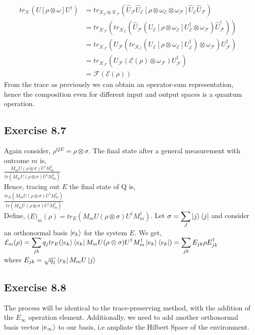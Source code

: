\documentclass[a4paper,12pt]{article}
\begin{document}
\begin{align*}
tr_\mathcal{K}(U[\rho\otimes\omega]U^\dagger)&=
tr_{\mathcal{K}_\mathcal{E}\otimes\mathcal{K}_\mathcal{F}}
(\hat{U}_\mathcal{F}\hat{U}_\mathcal{E}[\rho\otimes\omega_\mathcal{E}\otimes\omega_\mathcal{F}]
\hat{U}_\mathcal{E}\hat{U}_\mathcal{F})\\ 
&=tr_{\mathcal{K}_\mathcal{F}}(tr_{\mathcal{K}_\mathcal{E}}(\hat{U}_\mathcal{F}
(U_\mathcal{E}[\rho\otimes\omega_\mathcal{E}]U_\mathcal{E}^\dagger\otimes\omega_\mathcal{F})\hat{U}_\mathcal{F}^\dagger))\\
&= tr_{\mathcal{K}_\mathcal{F}}(U_\mathcal{F}(tr_{\mathcal{K}_\mathcal{E}}
(U_\mathcal{E}[\rho\otimes\omega_\mathcal{E}]U_\mathcal{E}^\dagger)\otimes\omega_\mathcal{F})U_\mathcal{F}^\dagger)\\
&= tr_{\mathcal{K}_\mathcal{F}}(U_\mathcal{F}(\mathcal{E}(\rho)
\otimes\omega_\mathcal{F})U_\mathcal{F}^\dagger)\\
&=\mathcal{F}(\mathcal{E}(\rho))
\end{align*}
From the trace as previously we can obtain an operator-sum representation, hence
the composition even for different input and output spaces is a quantum operation.
\subsection*{Exercise 8.7}
Again consider, $\rho^{QE}=\rho\otimes\sigma$. The final state after a general measurement
with outcome $m$ is,\\
$\frac{M_mU(\rho\otimes\sigma)U^\dagger M_m^\dagger}{tr(M_mU(\rho\otimes\sigma)U^\dagger M_m^\dagger)}$\\
Hence, tracing out $E$ the final state of Q is,\\
$\frac{tr_E(M_mU(\rho\otimes\sigma)U^\dagger M_m^\dagger)}{tr(M_mU(\rho\otimes\sigma)U^\dagger M_m^\dagger)}$\\
Define, $\mathcal(E)_m(\rho)=tr_E(M_mU(\rho\otimes\sigma)U^\dagger M_m^\dagger)$. Let 
$\sigma=\displaystyle \sum_J\ket{j}\bra{j}$ and consider an orthonormal basis $\ket{e_k}$
for the system $E$. We get,\\
$\mathcal{E}_m(\rho)=\displaystyle \sum_{jk}q_jtr_E(\ket{e_k}\bra{e_k}M_mU(\rho\otimes\sigma)U^\dagger M_m^\dagger\ket{e_k}\bra{e_k})=
\displaystyle \sum_{jk} E_{jk}\rho E_{jk}^\dagger$\\
where $E_{jk}=\sqrt{q_j}\bra{e_k}M_mU\ket{j}$
\subsection*{Exercise 8.8}
The process will be identical to the trace-preserving method, with the addition of the 
$E_\infty$ operation element. Additionally, we need to add another orthonormal basis vector
$\ket{e_\infty}$ to our basis, i.e ampliate the Hilbert Space of the environment.
\newpage
\end{document}
